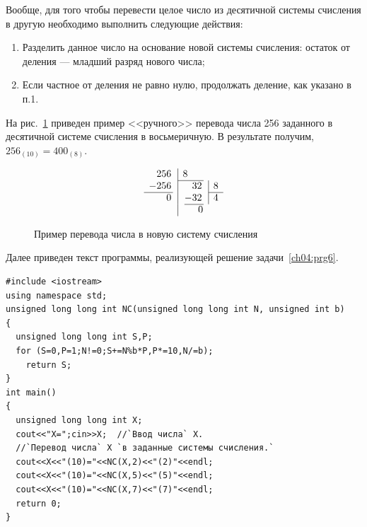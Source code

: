 
Вообще, для того чтобы перевести целое число из десятичной системы счисления в другую необходимо выполнить следующие
действия:

\begin{enumerate}
\item Разделить данное число на основание новой системы счисления: остаток от деления --- младший разряд нового числа;
\item Если частное от деления не равно нулю, продолжать деление, как указано в п.1.
\end{enumerate}
На рис.~\ref{ch04:refDrawing0} 
приведен пример <<ручного>> перевода числа 256 заданного в десятичной системе 
счисления в восьмеричную. В
результате получим,  $256_{(10)}=400_{(8)}$.
\begin{figure}[h]
\begin{minipage}[b]{0.5\textwidth}
$$
\begin{array}{r@{\,}l|l@{\,}l@{\,}l|l}
256 && \multicolumn{4}{l}8\\\cline{3-4}
- 256 &&& \phantom{-}32 &&8\\\cline{1-1}\cline{6-6}
 0 &&& - 32 && 4 \\\cline{4-4}
  && \multicolumn{4}{c}0\\
\end{array}
$$
\caption{Пример перевода числа в новую систему счисления}
\label{ch04:refDrawing0}
\end{minipage}
\end{figure}

Далее приведен текст программы, реализующей решение задачи~\ref{ch04:prg6}.

\begin{lstlisting}
#include <iostream>
using namespace std;
unsigned long long int NC(unsigned long long int N, unsigned int b)
{
  unsigned long long int S,P;
  for (S=0,P=1;N!=0;S+=N%b*P,P*=10,N/=b);
    return S;
}
int main()
{
  unsigned long long int X;
  cout<<"X=";cin>>X;  //`Ввод числа` X.
  //`Перевод числа` X `в заданные системы счисления.`
  cout<<X<<"(10)="<<NC(X,2)<<"(2)"<<endl;
  cout<<X<<"(10)="<<NC(X,5)<<"(5)"<<endl;
  cout<<X<<"(10)="<<NC(X,7)<<"(7)"<<endl;
  return 0;
}
\end{lstlisting}

